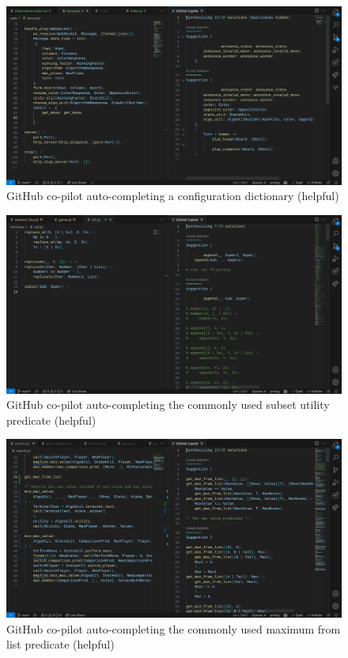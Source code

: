 \documentclass[11pt,a4paper]{article}
\begin{document}
\begin{figure}
    \includegraphics[width=\textwidth]{copilot-helpful-configuration-boilerplate}
    \caption{GitHub co-pilot auto-completing a configuration dictionary (helpful)}
    \label{fig:copilot_dictionary}
\end{figure}

\begin{figure}
    \includegraphics[width=\textwidth]{copilot-helpful-subset-predicate}
    \caption{GitHub co-pilot auto-completing the commonly used subset utility predicate (helpful)}
    \label{fig:copilot_subset}
\end{figure}

\begin{figure}
    \includegraphics[width=\textwidth]{copilot-helpful-maximum-predicate}
    \caption{GitHub co-pilot auto-completing the commonly used maximum from list predicate (helpful)}
    \label{fig:copilot_maximum}
\end{figure}
\end{document}
